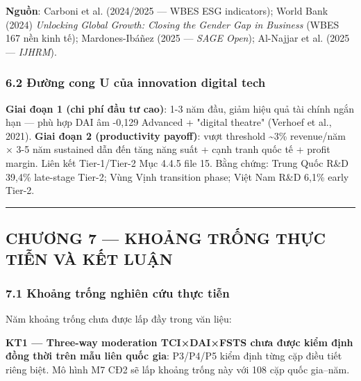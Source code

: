 \documentclass[12pt,a4paper]{article}
\begin{document}
\textbf{Nguồn}: Carboni et al. (2024/2025 --- WBES ESG indicators);
World Bank (2024) \emph{Unlocking Global Growth: Closing the Gender Gap
in Business} (WBES 167 nền kinh tế); Mardones-Ibáñez (2025 ---
\emph{SAGE Open}); Al-Najjar et al. (2025 --- \emph{IJHRM}).

\hypertarget{62-ux111ux1b0ux1eddng-cong-u-cux1ee7a-innovation-digital-tech}{%
\subsubsection{6.2 Đường cong U của innovation digital
tech}\label{62-ux111ux1b0ux1eddng-cong-u-cux1ee7a-innovation-digital-tech}}

\textbf{Giai đoạn 1 (chi phí đầu tư cao)}: 1-3 năm đầu, giảm hiệu quả
tài chính ngắn hạn --- phù hợp DAI âm -0,129 Advanced + "digital
theatre" (Verhoef et al., 2021). \textbf{Giai đoạn 2 (productivity
payoff)}: vượt threshold \textasciitilde3\% revenue/năm × 3-5 năm
sustained dẫn đến tăng năng suất + cạnh tranh quốc tế + profit margin.
Liên kết Tier-1/Tier-2 Mục 4.4.5 file 15. Bằng chứng: Trung Quốc R\&D
39,4\% late-stage Tier-2; Vùng Vịnh transition phase; Việt Nam R\&D
6,1\% early Tier-2.

\begin{center}\rule{0.5\linewidth}{0.5pt}\end{center}

\hypertarget{chux1b0ux1a1ng-7--khoux1ea3ng-trux1ed1ng-thux1ef1c-tiux1ec5n-vuxe0-kux1ebft-luux1eadn}{%
\subsection{CHƯƠNG 7 --- KHOẢNG TRỐNG THỰC TIỄN VÀ KẾT
LUẬN}\label{chux1b0ux1a1ng-7--khoux1ea3ng-trux1ed1ng-thux1ef1c-tiux1ec5n-vuxe0-kux1ebft-luux1eadn}}

\hypertarget{71-khoux1ea3ng-trux1ed1ng-nghiuxean-cux1ee9u-thux1ef1c-tiux1ec5n}{%
\subsubsection{7.1 Khoảng trống nghiên cứu thực
tiễn}\label{71-khoux1ea3ng-trux1ed1ng-nghiuxean-cux1ee9u-thux1ef1c-tiux1ec5n}}

Năm khoảng trống chưa được lấp đầy trong văn liệu:

\textbf{KT1 --- Three-way moderation TCI×DAI×FSTS chưa được kiểm định
đồng thời trên mẫu liên quốc gia}: P3/P4/P5 kiểm định từng cặp điều tiết
riêng biệt. Mô hình M7 CĐ2 sẽ lấp khoảng trống này với 108 cặp quốc
gia--năm.
\end{document}
